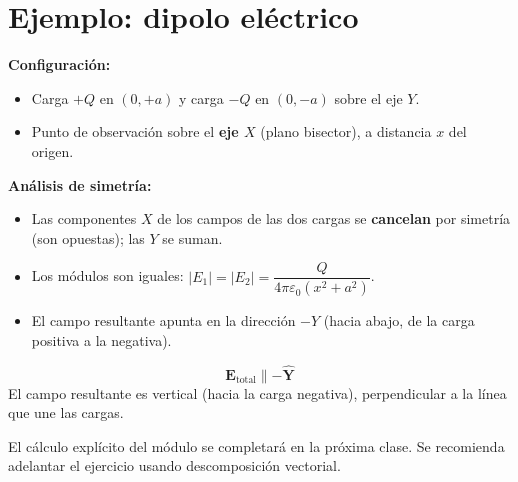 \documentclass[12pt,a4paper]{article}
\begin{document}
\section{Ejemplo: dipolo eléctrico}

\textbf{Configuración:}
\begin{itemize}[nosep]
  \item Carga $+Q$ en $(0, +a)$ y carga $-Q$ en $(0, -a)$ sobre el eje
        $Y$.
  \item Punto de observación sobre el \textbf{eje $X$} (plano
        bisector), a distancia $x$ del origen.
\end{itemize}

\textbf{Análisis de simetría:}
\begin{itemize}[nosep]
  \item Las componentes $X$ de los campos de las dos cargas se
        \textbf{cancelan} por simetría (son opuestas); las $Y$ se suman.
  \item Los módulos son iguales:
        $|E_1| = |E_2| = \dfrac{Q}{4\pi\varepsilon_0 (x^{2} + a^{2})}$.
  \item El campo resultante apunta en la dirección $-Y$ (hacia abajo,
        de la carga positiva a la negativa).
\end{itemize}



\begin{keybox}
  \[
  \boxed{\mathbf{E}_{\text{total}} \parallel -\hat{\mathbf{Y}}}
  \]
  El campo resultante es vertical (hacia la carga negativa),
  perpendicular a la línea que une las cargas.
\end{keybox}

\begin{notebox}[Tarea]
  El cálculo explícito del módulo se completará en la próxima clase.
  Se recomienda adelantar el ejercicio usando descomposición vectorial.
\end{notebox}
\end{document}
